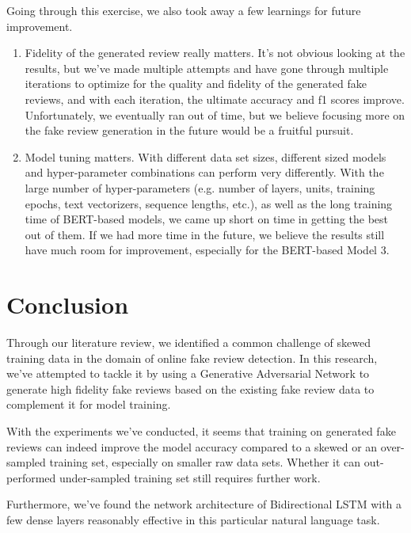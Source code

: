 \documentclass[conference, 11pt]{IEEEtran} %
\theoremstyle{plain}
\theoremstyle{definition}
\begin{document}
Going through this exercise, we also took away a few learnings for future improvement.
\begin{enumerate}
\item Fidelity of the generated review really matters. It's not obvious looking at the results, but we've made multiple attempts and have gone through multiple iterations to optimize for the quality and fidelity of the generated fake reviews, and with each iteration, the ultimate accuracy and f1 scores improve. Unfortunately, we eventually ran out of time, but we believe focusing more on the fake review generation in the future would be a fruitful pursuit.
\item Model tuning matters. With different data set sizes, different sized models and hyper-parameter combinations can perform very differently. With the large number of hyper-parameters (e.g. number of layers, units, training epochs, text vectorizers, sequence lengths, etc.), as well as the long training time of BERT-based models, we came up short on time in getting the best out of them. If we had more time in the future, we believe the results still have much room for improvement, especially for the BERT-based Model 3.
\end{enumerate}


\section{Conclusion}
\label{conclusion}
Through our literature review, we identified a common challenge of skewed training data in the domain of online fake review detection. In this research, we've attempted to tackle it by using a Generative Adversarial Network to generate high fidelity fake reviews based on the existing fake review data to complement it for model training.

With the experiments we've conducted, it seems that training on generated fake reviews can indeed improve the model accuracy compared to a skewed or an over-sampled training set, especially on smaller raw data sets. Whether it can out-performed under-sampled training set still requires further work.

Furthermore, we've found the network architecture of Bidirectional LSTM with a few dense layers reasonably effective in this particular natural language task.



\balance
\nocite{*}

\end{document}
